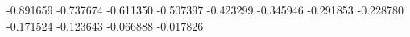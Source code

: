 -0.891659
-0.737674
-0.611350
-0.507397
-0.423299
-0.345946
-0.291853
-0.228780
-0.171524
-0.123643
-0.066888
-0.017826
